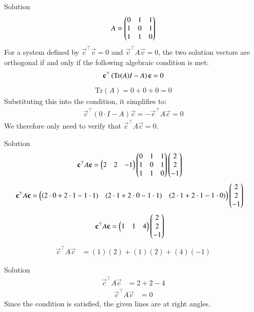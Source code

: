 \documentclass{beamer}
\begin{document}
\begin{frame}{Solution}
\begin{align}
     A = \begin{pmatrix} 0 & 1 & 1 \\ 1 & 0 & 1 \\ 1 & 1 & 0\end{pmatrix} 
\end{align}
For a system defined by $\vec{c}^\top \vec{v} = 0$ and $\vec{v}^\top A \vec{v} = 0$, the two solution vectors are orthogonal if and only if the following algebraic condition is met:
\begin{align}
     \mathbf{c}^\top \left(\text{Tr}(A)I - A\right)\mathbf{c} = 0
\end{align}
\begin{align}
    \text{Tr}(A) = 0 + 0 + 0 = 0
\end{align}
Substituting this into the condition, it simplifies to:
\begin{align}
    \vec{c}^\top (0 \cdot I - A) \vec{c} = -\vec{c}^\top A \vec{c} = 0
\end{align}
We therefore only need to verify that $\vec{c}^\top A \vec{c} = 0$.
\end{frame}
\begin{frame}{Solution}
\begin{align}
   \mathbf{c}^\top A \mathbf{c} &= \begin{pmatrix} 2 & 2 & -1\end{pmatrix} \begin{pmatrix}0 & 1 & 1 \\ 1 & 0 & 1 \\ 1 & 1 & 0\end{pmatrix} \begin{pmatrix}2 \\ 2 \\ -1\end{pmatrix} 
\end{align}
\begin{align}
    \mathbf{c}^\top A \mathbf{c}&= \begin{pmatrix}(2 \cdot 0 + 2 \cdot 1 - 1 \cdot 1) & (2 \cdot 1 + 2 \cdot 0 - 1 \cdot 1) & (2 \cdot 1 + 2 \cdot 1 - 1 \cdot 0)\end{pmatrix} \begin{pmatrix}2 \\ 2 \\ -1\end{pmatrix} 
\end{align}
\begin{align}
    \mathbf{c}^\top A \mathbf{c}&= \begin{pmatrix}1 & 1 & 4\end{pmatrix} \begin{pmatrix}2 \\ 2 \\ -1\end{pmatrix} 
\end{align}
\begin{align}
    \vec{c}^\top A \vec{c}&= (1)(2) + (1)(2) + (4)(-1) 
\end{align}
\end{frame}
\begin{frame}{Solution}
\begin{align}
    \vec{c}^\top A \vec{c}&= 2 + 2 - 4 
\end{align}
\begin{align} 
    \vec{c}^\top A \vec{c}&= 0
\end{align}
Since the condition is satisfied, the given lines are at right angles.
\end{frame}
\end{document}
